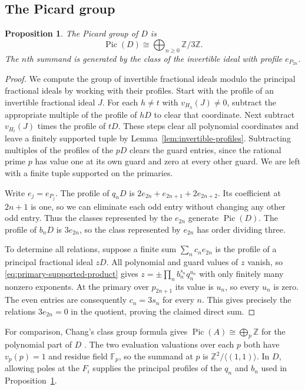 \documentclass{article}
\newtheorem{proposition}{Proposition}[section]
\theoremstyle{remark}
\begin{document}
\subsection{The Picard group}

\begin{proposition}
    \label{prop:picard-D}
    The Picard group of $D$ is
    \[
        \operatorname{Pic}(D) \cong \bigoplus_{n \ge 0} \mathbb{Z}/3\mathbb{Z}.
    \]
    The $n$th summand is generated by the class of the invertible ideal with profile $e_{P_{2n}}$.
\end{proposition}

\begin{proof}
    We compute the group of invertible fractional ideals modulo the principal fractional ideals by working with their profiles.
    Start with the profile of an invertible fractional ideal $J$.
    For each $h \ne t$ with $v_{H_h}(J) \ne 0$, subtract the appropriate multiple of the profile of $hD$ to clear that coordinate.
    Next subtract $v_{H_t}(J)$ times the profile of $tD$.
    These steps clear all polynomial coordinates and leave a finitely supported tuple by Lemma~\ref{lem:invertible-profiles}.
    Subtracting multiples of the profiles of the $pD$ clears the guard entries, since the rational prime $p$ has value one at its own guard and zero at every other guard.
    We are left with a finite tuple supported on the primaries.

    Write $e_j = e_{P_j}$.
    The profile of $q_nD$ is $2e_{2n} + e_{2n + 1} + 2e_{2n + 2}$.
    Its coefficient at $2n + 1$ is one, so we can eliminate each odd entry without changing any other odd entry.
    Thus the classes represented by the $e_{2n}$ generate $\operatorname{Pic}(D)$.
    The profile of $b_nD$ is $3e_{2n}$, so the class represented by $e_{2n}$ has order dividing three.

    To determine all relations, suppose a finite sum $\sum_n c_n e_{2n}$ is the profile of a principal fractional ideal $zD$.
    All polynomial and guard values of $z$ vanish, so \eqref{eq:primary-supported-product} gives $z = \pm\prod_n b_n^{s_n}q_n^{u_n}$ with only finitely many nonzero exponents.
    At the primary over $p_{2n + 1}$ its value is $u_n$, so every $u_n$ is zero.
    The even entries are consequently $c_n = 3s_n$ for every $n$.
    This gives precisely the relations $3e_{2n} = 0$ in the quotient, proving the claimed direct sum.
\end{proof}

For comparison, Chang's class group formula gives $\operatorname{Pic}(A) \cong \bigoplus_p \mathbb{Z}$ for the polynomial part of $D$ \cite[Corollary~2.6]{Chang}.
The two evaluation valuations over each $p$ both have $v_p(p) = 1$ and residue field $\mathbb{F}_p$, so the summand at $p$ is $\mathbb{Z}^2/\langle (1, 1) \rangle$.
In $D$, allowing poles at the $F_i$ supplies the principal profiles of the $q_n$ and $b_n$ used in Proposition~\ref{prop:picard-D}.
\end{document}
